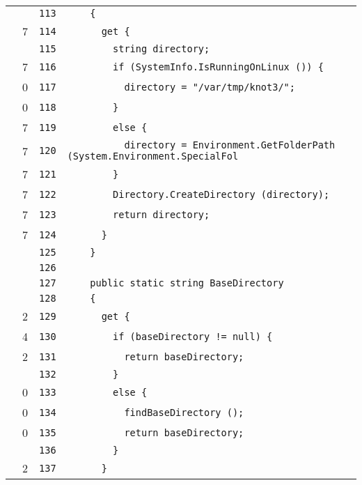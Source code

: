 \documentclass[a4paper,10pt]{article}
\begin{document}
\begin{longtable}[l]{lrrl}
\cellcolor{gray} &  & \verb~113~ & \verb~    {~\\
\cellcolor{green} & 7 & \verb~114~ & \verb~      get {~\\
\cellcolor{gray} &  & \verb~115~ & \verb~        string directory;~\\
\cellcolor{green} & 7 & \verb~116~ & \verb~        if (SystemInfo.IsRunningOnLinux ()) {~\\
\cellcolor{red} & 0 & \verb~117~ & \verb~          directory = "/var/tmp/knot3/";~\\
\cellcolor{red} & 0 & \verb~118~ & \verb~        }~\\
\cellcolor{green} & 7 & \verb~119~ & \verb~        else {~\\
\cellcolor{green} & 7 & \verb~120~ & \verb~          directory = Environment.GetFolderPath (System.Environment.SpecialFol~\\
\cellcolor{green} & 7 & \verb~121~ & \verb~        }~\\
\cellcolor{green} & 7 & \verb~122~ & \verb~        Directory.CreateDirectory (directory);~\\
\cellcolor{green} & 7 & \verb~123~ & \verb~        return directory;~\\
\cellcolor{green} & 7 & \verb~124~ & \verb~      }~\\
\cellcolor{gray} &  & \verb~125~ & \verb~    }~\\
\cellcolor{gray} &  & \verb~126~ & \verb~~\\
\cellcolor{gray} &  & \verb~127~ & \verb~    public static string BaseDirectory~\\
\cellcolor{gray} &  & \verb~128~ & \verb~    {~\\
\cellcolor{green} & 2 & \verb~129~ & \verb~      get {~\\
\cellcolor{green} & 4 & \verb~130~ & \verb~        if (baseDirectory != null) {~\\
\cellcolor{green} & 2 & \verb~131~ & \verb~          return baseDirectory;~\\
\cellcolor{gray} &  & \verb~132~ & \verb~        }~\\
\cellcolor{red} & 0 & \verb~133~ & \verb~        else {~\\
\cellcolor{red} & 0 & \verb~134~ & \verb~          findBaseDirectory ();~\\
\cellcolor{red} & 0 & \verb~135~ & \verb~          return baseDirectory;~\\
\cellcolor{gray} &  & \verb~136~ & \verb~        }~\\
\cellcolor{green} & 2 & \verb~137~ & \verb~      }~\\

\end{longtable}
\end{document}
